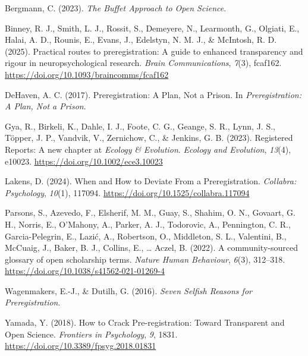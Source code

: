 \documentclass[
  letterpaper,
  DIV=11,
  numbers=noendperiod]{scrartcl}
\newlength{\cslhangindent}
\newenvironment{CSLReferences}[2] %
 {\begin{list}{}{%
  \setlength{\itemindent}{0pt}
  \setlength{\leftmargin}{0pt}
  \setlength{\parsep}{0pt}
  \ifodd #1
   \setlength{\leftmargin}{\cslhangindent}
   \setlength{\itemindent}{-1\cslhangindent}
  \fi
  \setlength{\itemsep}{#2\baselineskip}}}
 {\end{list}}
\begin{document}
\protect{}\label{refs}
\begin{CSLReferences}{1}{0}
Bergmann, C. (2023). \emph{The {Buffet Approach} to {Open Science}}.

Binney, R. J., Smith, L. J., Rossit, S., Demeyere, N., Learmonth, G.,
Olgiati, E., Halai, A. D., Rounis, E., Evans, J., Edelstyn, N. M. J., \&
McIntosh, R. D. (2025). Practical routes to preregistration: A guide to
enhanced transparency and rigour in neuropsychological research.
\emph{Brain Communications}, \emph{7}(3), fcaf162.
\url{https://doi.org/10.1093/braincomms/fcaf162}

DeHaven, A. C. (2017). Preregistration: {A Plan}, {Not} a {Prison}. In
\emph{Preregistration: A Plan, Not a Prison}.

Gya, R., Birkeli, K., Dahle, I. J., Foote, C. G., Geange, S. R., Lynn,
J. S., Töpper, J. P., Vandvik, V., Zernichow, C., \& Jenkins, G. B.
(2023). Registered {Reports}: {A} new chapter at {\emph{Ecology}}{
\emph{\&} }{\emph{Evolution}}. \emph{Ecology and Evolution},
\emph{13}(4), e10023. \url{https://doi.org/10.1002/ece3.10023}

Lakens, D. (2024). When and {How} to {Deviate From} a {Preregistration}.
\emph{Collabra: Psychology}, \emph{10}(1), 117094.
\url{https://doi.org/10.1525/collabra.117094}

Parsons, S., Azevedo, F., Elsherif, M. M., Guay, S., Shahim, O. N.,
Govaart, G. H., Norris, E., O'Mahony, A., Parker, A. J., Todorovic, A.,
Pennington, C. R., Garcia-Pelegrin, E., Lazić, A., Robertson, O.,
Middleton, S. L., Valentini, B., McCuaig, J., Baker, B. J., Collins, E.,
\ldots{} Aczel, B. (2022). A community-sourced glossary of open
scholarship terms. \emph{Nature Human Behaviour}, \emph{6}(3), 312--318.
\url{https://doi.org/10.1038/s41562-021-01269-4}

Wagenmakers, E.-J., \& Dutilh, G. (2016). \emph{Seven {Selfish Reasons}
for {Preregistration}}.

Yamada, Y. (2018). How to {Crack Pre}-registration: {Toward Transparent}
and {Open Science}. \emph{Frontiers in Psychology}, \emph{9}, 1831.
\url{https://doi.org/10.3389/fpsyg.2018.01831}

\end{CSLReferences}
\end{document}
